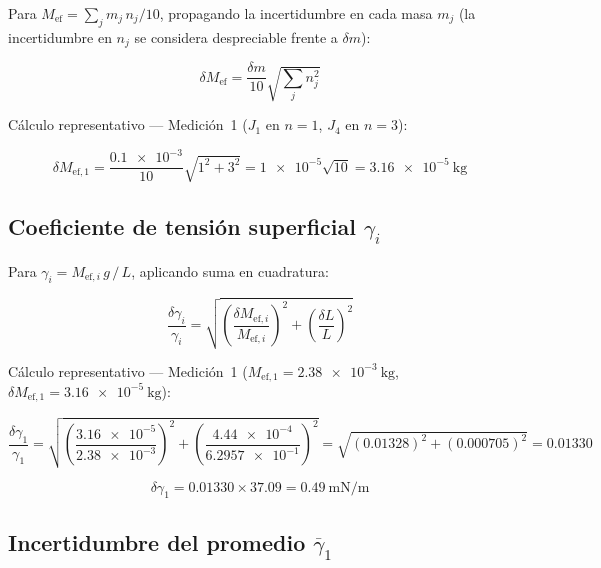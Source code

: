 \begin{appendices}
Para $M_{\text{ef}} = \sum_j m_j\,n_j/10$, propagando la incertidumbre
en cada masa $m_j$ (la incertidumbre en $n_j$ se considera despreciable
frente a $\delta m$):

\begin{equation}
    \delta M_{\text{ef}} = \frac{\delta m}{10}
    \sqrt{\sum_j n_j^2}
\end{equation}

Cálculo representativo — Medición~1
($J_1$ en $n=1$, $J_4$ en $n=3$):

\begin{equation*}
    \delta M_{\text{ef},1}
    = \frac{\num{0.1e-3}}{10}\sqrt{1^2 + 3^2}
    = \num{1e-5}\sqrt{10}
    = \qty{3.16e-5}{\kilogram}
\end{equation*}

\subsection{Coeficiente de tensión superficial \texorpdfstring{$\gamma_i$}{gamma\_i}}

Para $\gamma_i = M_{\text{ef},i}\,g\,/\,L$, aplicando suma en
cuadratura:

\begin{equation}
    \frac{\delta\gamma_i}{\gamma_i} =
    \sqrt{
        \left(\frac{\delta M_{\text{ef},i}}{M_{\text{ef},i}}\right)^2 +
        \left(\frac{\delta L}{L}\right)^2
    }
\end{equation}

Cálculo representativo — Medición~1
($M_{\text{ef},1} = \qty{2.38e-3}{\kilogram}$,
$\delta M_{\text{ef},1} = \qty{3.16e-5}{\kilogram}$):

\begin{equation*}
    \frac{\delta\gamma_1}{\gamma_1}
    = \sqrt{
        \left(\frac{\num{3.16e-5}}{\num{2.38e-3}}\right)^2 +
        \left(\frac{\num{4.44e-4}}{\num{6.2957e-1}}\right)^2
      }
    = \sqrt{(\num{0.01328})^2 + (\num{0.000705})^2}
    = \num{0.01330}
\end{equation*}

\begin{equation*}
    \delta\gamma_1 = \num{0.01330} \times \num{37.09} = \qty{0.49}{\milli\newton\per\meter}
\end{equation*}

\subsection{Incertidumbre del promedio \texorpdfstring{$\overline{\gamma}_1$}{gamma promedio}}


\end{appendices}
